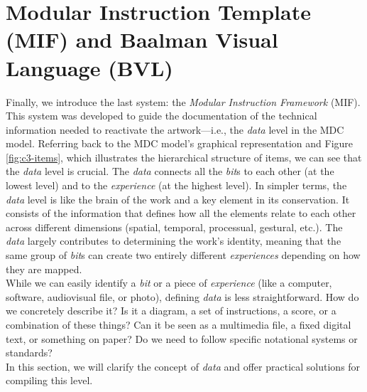 \section{Modular Instruction Template (MIF) and Baalman Visual Language (BVL)}
Finally, we introduce the last system: the \textit{Modular Instruction Framework} (MIF). This system was developed to guide the documentation of the technical information needed to reactivate the artwork—i.e., the \textit{data} level in the MDC model. Referring back to the MDC model’s graphical representation and Figure \ref{fig:c3-items}, which illustrates the hierarchical structure of items, we can see that the \textit{data} level is crucial. The \textit{data} connects all the \textit{bit}s to each other (at the lowest level) and to the \textit{experience} (at the highest level). In simpler terms, the \textit{data} level is like the brain of the work and a key element in its conservation. It consists of the information that defines how all the elements relate to each other across different dimensions (spatial, temporal, processual, gestural, etc.). The \textit{data} largely contributes to determining the work’s identity, meaning that the same group of \textit{bit}s can create two entirely different \textit{experiences} depending on how they are mapped.\\
While we can easily identify a \textit{bit} or a piece of \textit{experience} (like a computer, software, audiovisual file, or photo), defining \textit{data} is less straightforward. How do we concretely describe it? Is it a diagram, a set of instructions, a score, or a combination of these things? Can it be seen as a multimedia file, a fixed digital text, or something on paper? Do we need to follow specific notational systems or standards?\\
In this section, we will clarify the concept of \textit{data} and offer practical solutions for compiling this level.\\
